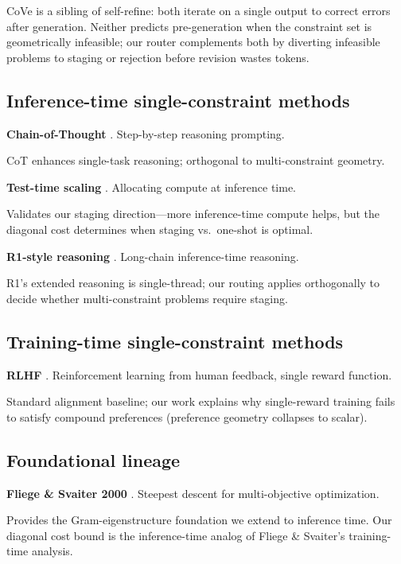 CoVe is a sibling of self-refine: both iterate on a single output to
correct errors after generation. Neither predicts pre-generation when the
constraint set is geometrically infeasible; our router complements both by
diverting infeasible problems to staging or rejection before revision wastes
tokens.

\subsection{Inference-time single-constraint methods}

\hypertarget{rw:cot}{}\textbf{Chain-of-Thought} \citep{wei2022chain}.
Step-by-step reasoning prompting.

CoT enhances single-task reasoning; orthogonal to multi-constraint
geometry.

\hypertarget{rw:ttscale}{}\textbf{Test-time scaling} \citep{snell2024scaling}.
Allocating compute at inference time.

Validates our staging direction---more inference-time compute helps,
but the diagonal cost determines when staging vs.\ one-shot is optimal.

\hypertarget{rw:r1}{}\textbf{R1-style reasoning} \citep{deepseek2025r1}.
Long-chain inference-time reasoning.

R1's extended reasoning is single-thread; our routing applies
orthogonally to decide whether multi-constraint problems require staging.

\subsection{Training-time single-constraint methods}

\hypertarget{rw:rlhf}{}\textbf{RLHF} \citep{ouyang2022training,bai2022training}.
Reinforcement learning from human feedback, single reward function.

Standard alignment baseline; our work explains why single-reward
training fails to satisfy compound preferences (preference geometry collapses
to scalar).

\subsection{Foundational lineage}

\hypertarget{rw:fliege}{}\textbf{Fliege \& Svaiter 2000} \citep{fliege2000steepest}.
Steepest descent for multi-objective optimization.

Provides the Gram-eigenstructure foundation we extend to inference
time. Our diagonal cost bound is the inference-time analog of Fliege \&
Svaiter's training-time analysis.

